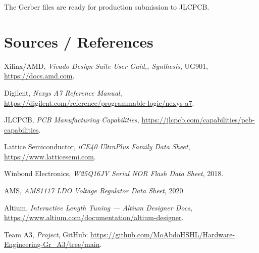 \documentclass[11pt,a4paper]{article}
\begin{document}
The Gerber files are ready for production submission to JLCPCB.

\section*{Sources / References}

\begin{enumerate}[leftmargin=2em, label={[\arabic*]}]
  \item Xilinx/AMD, \textit{Vivado Design Suite User Guid,, Synthesis},
        UG901, \url{https://docs.amd.com}.
  \item \small{Digilent, \textit{Nexys A7 Reference Manual},
        \url{https://digilent.com/reference/programmable-logic/nexys-a7}.}
  \item JLCPCB, \textit{PCB Manufacturing Capabilities},
        \url{https://jlcpcb.com/capabilities/pcb-capabilities}.
  \item \small{Lattice Semiconductor, \textit{iCE40 UltraPlus Family Data Sheet},
        \url{https://www.latticesemi.com}.}
  \item Winbond Electronics, \textit{W25Q16JV Serial NOR Flash Data Sheet},
        2018.
  \item AMS, \textit{AMS1117 LDO Voltage Regulator Data Sheet}, 2020.
  \item Altium, \textit{Interactive Length Tuning — Altium Designer Docs},
        \url{https://www.altium.com/documentation/altium-designer}.
  \item Team A3, \textit{Project}, GitHub:
        \url{https://github.com/MoAbdoHSHL/Hardware-Engineering-Gr_A3/tree/main}.
\end{enumerate}
\end{document}
